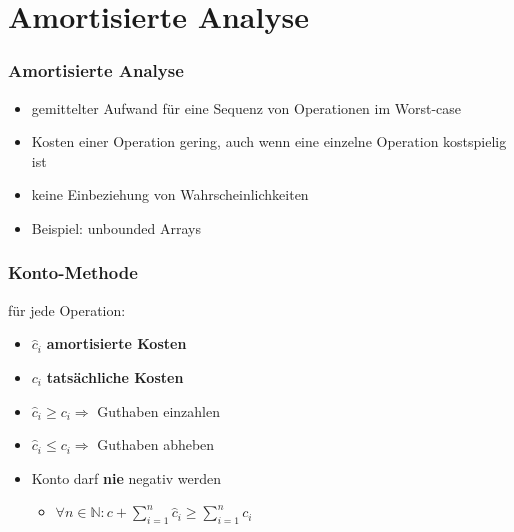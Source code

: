 \documentclass[18pt]{beamer}
\begin{document}
\section{Amortisierte Analyse}
\begin{frame}
	\frametitle{Amortisierte Analyse}
	\begin{itemize}
		\item gemittelter Aufwand für eine Sequenz von Operationen im Worst-case
		\item Kosten einer Operation gering, auch wenn eine einzelne Operation kostspielig ist
		\item keine Einbeziehung von Wahrscheinlichkeiten
		\item Beispiel: unbounded Arrays 
	\end{itemize}
\end{frame}

\begin{frame}
	\frametitle{Konto-Methode}
	für jede Operation:
	\begin{itemize}
		\item $\hat{c}_i$ \textbf{amortisierte Kosten}
		\item $c_i$ \textbf{tatsächliche Kosten}
		\item $\hat{c}_i \geq c_i  \Rightarrow $  Guthaben einzahlen
		\item $\hat{c}_i \leq c_i  \Rightarrow $  Guthaben abheben
		\item Konto darf \textbf{nie} negativ werden
		\begin{itemize}
			\item $ \forall n \in \mathbb{N} : c + \sum_{i=1} ^n \hat{c}_i \geq \sum_{i=1} ^n c_i$
		\end{itemize}

	\end{itemize}

\end{frame}
\end{document}
